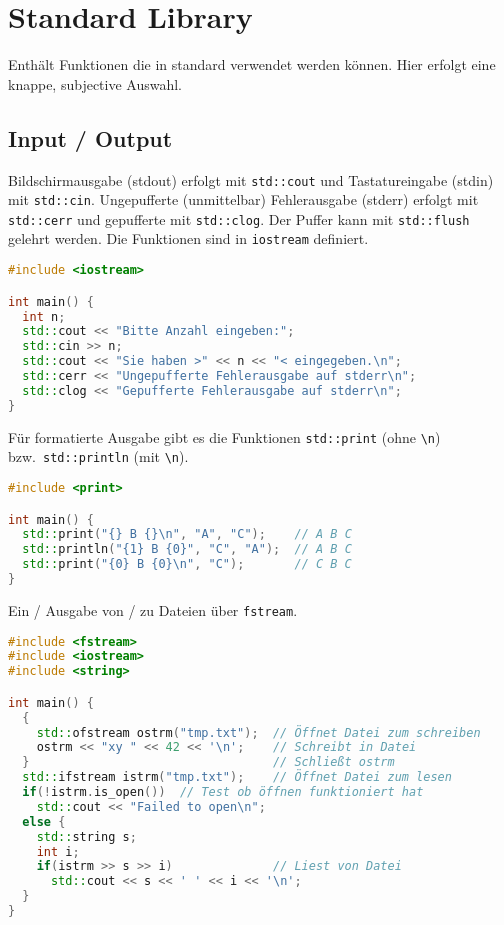\section{Standard Library}

Enthält Funktionen die in standard \cpp verwendet werden können. Hier erfolgt
eine knappe, subjective Auswahl.

\subsection{Input / Output}

Bildschirmausgabe (stdout) erfolgt mit \lstinline|std::cout| und Tastatureingabe
(stdin) mit \lstinline|std::cin|. Ungepufferte (unmittelbar) Fehlerausgabe
(stderr) erfolgt mit \lstinline|std::cerr| und gepufferte mit
\lstinline|std::clog|. Der Puffer kann mit \lstinline|std::flush| gelehrt
werden. Die Funktionen sind in \lstinline|iostream| definiert.

\begin{lstlisting}[language=C++]
#include <iostream>

int main() {
  int n;
  std::cout << "Bitte Anzahl eingeben:";
  std::cin >> n;
  std::cout << "Sie haben >" << n << "< eingegeben.\n";
  std::cerr << "Ungepufferte Fehlerausgabe auf stderr\n";
  std::clog << "Gepufferte Fehlerausgabe auf stderr\n";
}
\end{lstlisting}

Für formatierte Ausgabe gibt es die Funktionen \lstinline|std::print| (ohne
\lstinline|\n|) bzw.\ \lstinline|std::println| (mit \lstinline|\n|).

\begin{lstlisting}[language=C++]
#include <print>

int main() {
  std::print("{} B {}\n", "A", "C");    // A B C
  std::println("{1} B {0}", "C", "A");  // A B C
  std::print("{0} B {0}\n", "C");       // C B C
}
\end{lstlisting}

Ein / Ausgabe von / zu Dateien über \lstinline|fstream|.

\begin{lstlisting}[language=C++]
#include <fstream>
#include <iostream>
#include <string>

int main() {
  {
    std::ofstream ostrm("tmp.txt");  // Öffnet Datei zum schreiben
    ostrm << "xy " << 42 << '\n';    // Schreibt in Datei
  }                                  // Schließt ostrm
  std::ifstream istrm("tmp.txt");    // Öffnet Datei zum lesen
  if(!istrm.is_open())  // Test ob öffnen funktioniert hat
    std::cout << "Failed to open\n";
  else {
    std::string s;
    int i;
    if(istrm >> s >> i)              // Liest von Datei
      std::cout << s << ' ' << i << '\n';
  }
}
\end{lstlisting}

